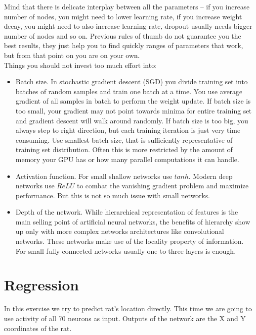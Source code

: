 \documentclass[a4paper,11pt]{article}
\begin{document}
Mind that there is delicate interplay between all the parameters -- if you increase number of nodes, you might need to lower learning rate, if you increase weight decay, you might need to also increase learning rate, dropout usually needs bigger number of nodes and so on. Previous rules of thumb do not guarantee you the best results, they just help you to find quickly ranges of parameters that work, but from that point on you are on your own.\\

Things you should not invest too much effort into:

\begin{itemize}
	\item Batch size. In stochastic gradient descent (SGD) you divide training set into batches of random samples and train one batch at a time. You use average gradient of all samples in batch to perform the weight update. If batch size is too small, your gradient may not point towards minima for entire training set and gradient descent will walk around randomly. If batch size is too big, you always step to right direction, but each training iteration is just very time consuming. Use smallest batch size, that is sufficiently representative of training set distribution. Often this is more restricted by the amount of memory your GPU has or how many parallel computations it can handle.
	\item Activation function. For small shallow networks use $tanh$. Modern deep networks use $ReLU$ to combat the vanishing gradient problem and maximize performance. But this is not so much issue with small networks.
	\item Depth of the network. While hierarchical representation of features is the main selling point of artificial neural networks, the benefits of hierarchy show up only with more complex networks architectures like convolutional networks. These networks make use of the locality property of information. For small fully-connected networks usually one to three layers is enough.
 \end{itemize}

%
%
\section{Regression}

In this exercise we try to predict rat's location directly. This time we are going to use activity of all 70 neurons as input. Outputs of the network are the X and Y coordinates of the rat.\\
\end{document}
